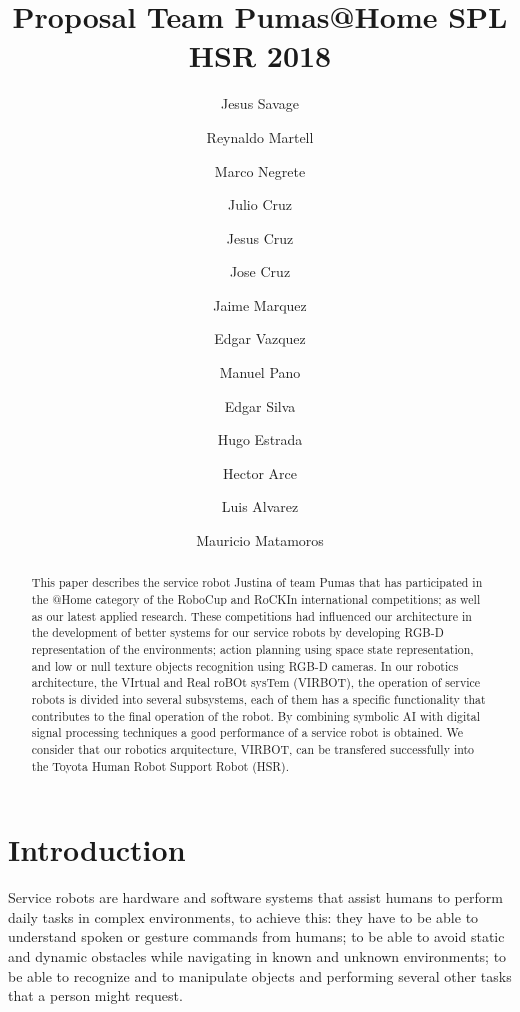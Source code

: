 \documentclass{llncs}
\begin{document}
\title{Proposal Team Pumas@Home SPL HSR 2018 
}
\author{
	Jesus Savage 
	\and Reynaldo Martell 
	\and Marco Negrete 
	\and Julio Cruz 
	\and Jesus Cruz
	\and Jose Cruz
	\and Jaime Marquez 
	\and Edgar Vazquez
	\and Manuel Pano 
	\and Edgar Silva
	\and Hugo Estrada 
	\and Hector Arce 
	\and Luis Alvarez
	\and Mauricio Matamoros
}
\maketitle


\begin{abstract}

This paper describes the service robot Justina of team Pumas that has participated in the @Home category of the RoboCup and RoCKIn
international competitions; as well as our latest applied research. These competitions had influenced our architecture
in the development of better systems for our service robots by developing RGB-D representation of the environments; action
planning using space state representation, and low or null texture objects recognition using RGB-D cameras. 
In our robotics architecture, the VIrtual and Real roBOt sysTem (VIRBOT), the operation of service robots is divided into
several subsystems, each of them has a specific functionality  that contributes to the final operation of the robot.
By combining symbolic AI with digital signal processing techniques a good performance of a service robot is obtained.
We consider that our robotics arquitecture, VIRBOT, can be transfered successfully 
into the Toyota Human Robot Support Robot (HSR). 

\end{abstract}


\section{Introduction}

Service robots are hardware and software systems that assist humans to perform daily tasks in complex environments, to achieve this: 
they have to be able to understand spoken or gesture commands from humans;  to be able to avoid static and
dynamic obstacles while navigating in known and unknown environments; to be able to recognize and to manipulate objects and performing 
several other tasks that a person might request. 
\end{document}
